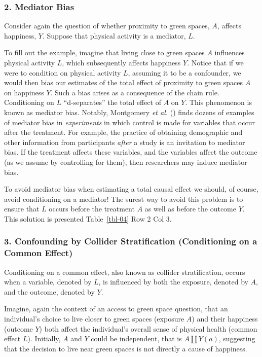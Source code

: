 \documentclass[
  singlecolumn]{article}
\begin{document}
\subsubsection{2. Mediator Bias}\label{mediator-bias}

Consider again the question of whether proximity to green spaces, \(A\),
affects happiness, \(Y\). Suppose that physical activity is a mediator,
\(L\).

To fill out the example, imagine that living close to green spaces \(A\)
influences physical activity \(L\), which subsequently affects happiness
\(Y\). Notice that if we were to condition on physical activity \(L\),
assuming it to be a confounder, we would then bias our estimates of the
total effect of proximity to green spaces \(A\) on happiness \(Y\). Such
a bias arises as a consequence of the chain rule. Conditioning on \(L\)
``d-separates'' the total effect of \(A\) on \(Y\). This phenomenon is
known as mediator bias. Notably, Montgomery \emph{et al.}
() finds dozens of examples of
mediator bias in \emph{experiments} in which control is made for
variables that occur after the treatment. For example, the practice of
obtaining demographic and other information from participants
\emph{after} a study is an invitation to mediator bias. If the treatment
affects these variables, and the variables affect the outcome (as we
assume by controlling for them), then researchers may induce mediator
bias.

To avoid mediator bias when estimating a total causal effect we should,
of course, avoid conditioning on a mediator! The surest way to avoid
this problem is to ensure that \(L\) occurs before the treatment \(A\)
as well as before the outcome \(Y\). This solution is presented
Table~\ref{tbl-04} Row 2 Col 3.

\subsubsection{3. Confounding by Collider Stratification (Conditioning
on a Common
Effect)}\label{confounding-by-collider-stratification-conditioning-on-a-common-effect}

Conditioning on a common effect, also known as collider stratification,
occurs when a variable, denoted by \(L\), is influenced by both the
exposure, denoted by \(A\), and the outcome, denoted by \(Y\).

Imagine, again the context of an access to green space question, that an
individual's choice to live closer to green spaces (exposure \(A\)) and
their happiness (outcome \(Y\)) both affect the individual's overall
sense of physical health (common effect \(L\)). Initially, \(A\) and
\(Y\) could be independent, that is \(A \coprod Y(a)\), suggesting that
the decision to live near green spaces is not directly a cause of
happiness.
\end{document}
